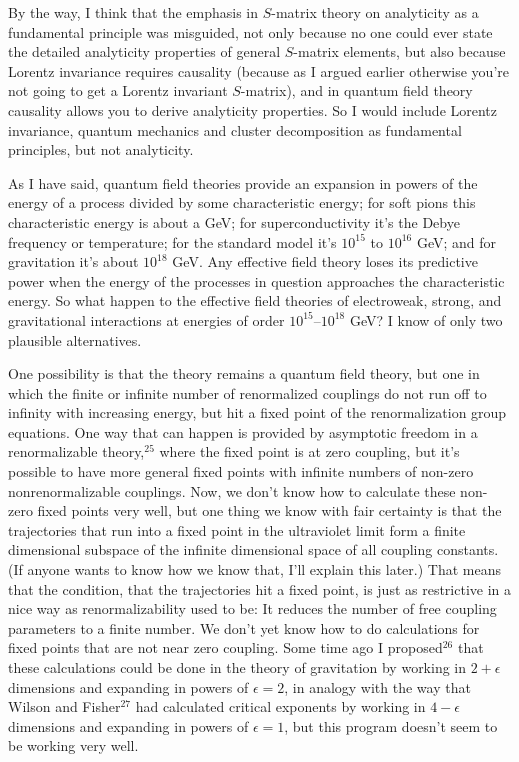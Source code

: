 By the way, I think that the emphasis in $S$-matrix theory
on analyticity as a fundamental principle was misguided, not
only because no one could ever state  the detailed
analyticity properties of general $S$-matrix elements, but
also because Lorentz invariance requires causality (because
as I argued earlier otherwise you're not going to get a
Lorentz invariant $S$-matrix), and in quantum field theory
causality allows you to derive analyticity properties.  So I
would include Lorentz invariance, quantum mechanics and
cluster decomposition as fundamental principles, but not
analyticity.

 As I have said, quantum field theories provide an expansion
in powers of the energy of a process divided by  some
characteristic energy; for soft pions this characteristic
energy is about a GeV; for superconductivity it's the Debye
frequency or temperature; for the standard model it's
$10^{15}$ to $10^{16}$ GeV; and for gravitation it's about
$10^{18}$ GeV.  Any effective field theory loses its
predictive power when the energy of the processes in
question approaches the characteristic energy.  So what
happen to the effective field  theories of electroweak,
strong, and gravitational interactions at  energies of order
$10^{15}$--$10^{18}$ GeV?  I know of only two plausible
alternatives.

One possibility is that the theory remains a quantum field
theory, but one in which  the finite or infinite number of
renormalized couplings do not run off to infinity with
increasing energy, but hit a fixed point of the
renormalization group equations.  One way that can happen
is provided by asymptotic freedom in a renormalizable
theory,$^{25}$ where the fixed point is at zero coupling,
but it's
possible to have more general fixed points with infinite
numbers of non-zero nonrenormalizable couplings.  Now, we
don't know how to calculate these non-zero fixed points very
well, but one thing we know with fair certainty is that the
trajectories that run into a fixed point in the ultraviolet
limit form a finite dimensional subspace of the infinite
dimensional space of all coupling constants.  (If anyone
wants to know how we know that, I'll explain this later.)
That means that the condition, that the trajectories hit a
fixed point, is just as restrictive in a nice way as
renormalizability used to be:  It  reduces the number of
free coupling parameters to a finite number.  We don't yet
know how to do calculations for fixed points that are not
near zero coupling.  Some time ago I proposed$^{26}$ that
these
calculations could be done in the theory of gravitation by
working in $2 + \epsilon$ dimensions and expanding in powers
of $\epsilon=2$, in analogy with the way  that Wilson and
Fisher$^{27}$ had calculated critical exponents by working
in
$4 - \epsilon$ dimensions and expanding in powers of
$\epsilon=1$, but this program doesn't seem to be working
very well.

